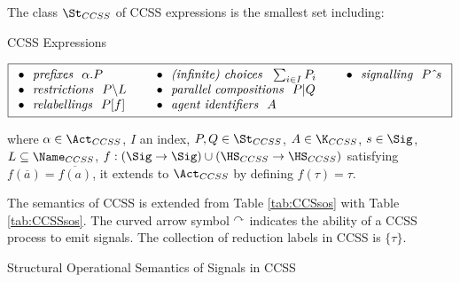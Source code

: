 \documentclass[adraft,hidelinks]{eptcs}
\begin{document}
The class $\St_{CCSS}$ of CCSS expressions is the smallest set including:
\begin{table}[h]
\centering
\caption{CCSS Expressions}
\label{CCSSExp}
$\boxed{
  \begin{array}{lll}
    \bullet\ \  \text{\emph{prefixes\ \ }} \alpha.P &
    \hspace{5mm}\bullet\ \  \text{\emph{(infinite) choices\ \ }}  \sum_{i\in I} P_i &
    \hspace{5mm}\bullet\ \  \text{\emph{signalling\ \ }}  P\signals s \\
    \bullet\ \  \text{\emph{restrictions\ \ }} P\backslash L &
    \hspace{5mm}\bullet\ \  \text{\emph{parallel compositions\ \ }}  P|Q \\
    \bullet\ \  \text{\emph{relabellings\ \ }}  P[f] &
    \hspace{5mm}\bullet\ \  \text{\emph{agent identifiers\ \ }} A
  \end{array}}$
\end{table}

where $\alpha\in\Act_{CCSS}$, $I$ an index, $P,Q\in\St_{CCSS}$, $A\in\K_{CCSS}$, $s\in\Sig$, $L\subseteq \Name_{CCSS}$, $f:(\Sig\to\Sig)\cup(\HS_{CCSS}\to\HS_{CCSS})$ satisfying $f(\overline{a}) = \overline{f(a)}$, it extends to $\Act_{CCSS}$ by defining $f(\tau) = \tau$.

The semantics of CCSS is extended from Table \ref{tab:CCSsos} with Table \ref{tab:CCSSsos}.
The curved arrow symbol $^{\curvearrowright }$ indicates the ability of a CCSS process to emit signals.
The collection of reduction labels in CCSS is $\{\tau\}$.

\begin{table}[t]
\caption{Structural Operational Semantics of Signals in CCSS}
\normalsize
\begin{center}
\end{center}
\label{tab:CCSSsos}
\end{table}
\end{document}
